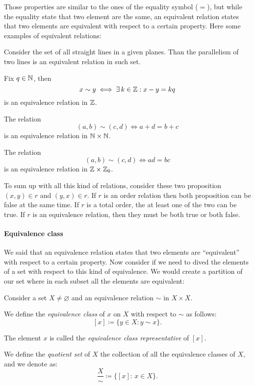 Those properties are similar to the ones of the equality symbol ($=$), but while the equality state that two element are the same, an equivalent relation states that two elements are equivalent with respect to a certain property. Here some examples of equivalent relations:
\begin{exam}
	Consider the set of all straight lines in a given planes. Than the parallelism of two lines is an equivalent relation in such set.
\end{exam}		
\begin{exam}
	Fix $q \in \mathbb N$, then 
	$$
		x\sim y 
		\iff \exists \, k \in \mathbb Z: x-y = kq
	$$
	is an equivalence relation in $\mathbb Z$.
\end{exam}		
\begin{exam} 
	The relation 
	$$
		(a,b) \sim (c,d) 
		\iff a+d = b+c
	$$
	is an equivalence relation in $\mathbb N \times \mathbb N$.
\end{exam}		
\begin{exam}
	The relation 
	$$
		(a,b) \sim (c,d) 
		\iff ad=bc
	$$
	is an equivalence relation in $\mathbb Z \times \mathbb Z_0$.
\end{exam}

To sum up with all this kind of relations, consider these two proposition $(x,y) \in r$ and $(y,x) \in r$. If $r$ is an order relation then both proposition can be false at the same time. If $r$ is a total order, the at least one of the two can be true. If $r$ is an equivalence relation, then they must be both true or both false.

\paragraph{Equivalence class} We said that an equivalence relation states that two elements are ``equivalent'' with respect to a certain property. Now consider if we need to dived the elements of a set with respect to this kind of equivalence. We would create a partition of our set where in each subset all the elements are equivalent:

\begin{defn}\label{defn-equiv-class-quot-set}
	Consider a set $X \neq \varnothing$ and an equivalence relation $\sim$  in $X \times X$.
	
	We define the \emph{equivalence class} of $x$ on $X$ with respect to $\sim$ as follows: $$\left[x\right]\coloneqq \{y \in X: y \sim x\}.$$
	
	The element $x$ is called the \emph{equivalence class representative} of $\left[x\right]$.
	
	We define the \emph{quotient set} of $X$ the collection of all the equivalence classes of $X$, and we denote as:
	$$
		\frac{X}{\sim}
		\coloneqq \{\left[x\right]: \, x \in X \}
	.
	$$
\end{defn}

